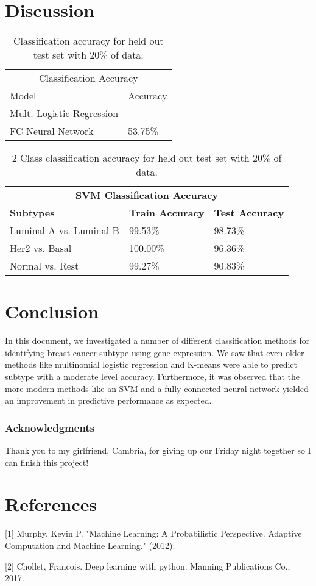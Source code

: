 \documentclass{article}
\begin{document}
\section{Discussion}
\begin{table}[t]
  \caption{Classification accuracy for held out test set with 20\% of data.}
  \label{class_acc}
  \centering
  \begin{tabular}{ll}
    \toprule
    \multicolumn{2}{c}{Classification Accuracy}                   \\
    \cmidrule{1-2}
    Model  & Accuracy  \\
    \midrule
     Mult. Logistic Regression & \\
	 FC Neural Network & 53.75\% \\
    \bottomrule
  \end{tabular}
\end{table}

\begin{table}[t]
  \caption{2 Class classification accuracy for held out test set with 20\% of data.}
  \label{class_acc_2}
  \centering
  \begin{tabular}{lll}
    \toprule
    \multicolumn{3}{c}{\textbf{SVM Classification Accuracy}}                   \\
    \cmidrule{1-3}
    \textbf{Subtypes}  & \textbf{Train Accuracy}  & \textbf{Test Accuracy}\\
    \midrule
     Luminal A vs. Luminal B & 99.53\% & 98.73\%\\
	 Her2 vs. Basal &  100.00\% & 96.36\%\\
	 Normal vs. Rest & 99.27\% & 90.83\%\\
    \bottomrule
  \end{tabular}
\end{table}

\section{Conclusion}
In this document, we investigated a number of different classification methods for identifying breast cancer subtype using gene expression. We saw that even older methods like multinomial logistic regression and K-means were able to predict subtype with a moderate level accuracy. Furthermore, it was observed that the more modern methods like an SVM and a fully-connected neural network yielded an improvement in predictive performance as expected.

\subsubsection*{Acknowledgments}
Thank you to my girlfriend, Cambria, for giving up our Friday night together so I can finish this project!

\section*{References}

\small

[1] Murphy, Kevin P. "Machine Learning: A Probabilistic Perspective. Adaptive Computation and Machine Learning." (2012).

[2] Chollet, Francois. Deep learning with python. Manning Publications Co., 2017.
\end{document}
